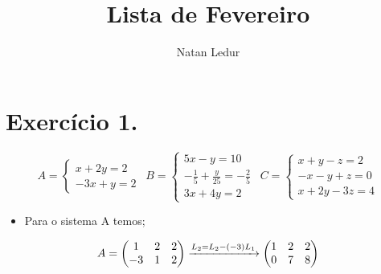 \documentclass{article}
\title{Lista de Fevereiro}
\author{Natan Ledur}
\begin{document}
\maketitle

\section{Exercício 1.}
\begin{equation*}
      A= \left\{\begin{matrix} x + 2y = 2 \\  -3x + y=2 \end{matrix}\right. 
       \ \
      B = \left\{\begin{matrix} 5x - y = 10 \\ -\frac{1}{5} + \frac{y}{25} = -\frac{2}{5} \\ 3x+4y=2 \end{matrix}\right.
      \ \
      C = \left\{\begin{matrix}  x + y - z = 2 \\ -x -y +z = 0 \\ x+2y-3z=4 \end{matrix}\right.
      \end{equation*}
      \begin{itemize}
          \item Para o sistema A temos;
      \end{itemize}
      \begin{equation*}
      A=\begin{pmatrix}  1&2  &2 \\   -3&  1& 2\end{pmatrix}
      \xrightarrow[]{L_2=L_2 - (-3)L_1}
      \begin{pmatrix} 1 &2  &2 \\  0& 7 & 8 \end{pmatrix}\displaystyle \displaystyle 
      \end{equation*}
       
\end{document}
